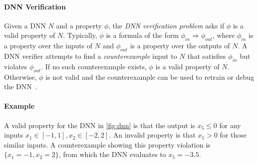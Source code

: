 \documentclass[oneside,11pt,dvipsnames]{book}
\begin{document}
\paragraph{DNN Verification} Given a DNN \(N\) and a property $\phi$, the \emph{DNN verification problem} asks if $\phi$ is a valid property of $N$.
Typically, $\phi$ is a formula of the form $\phi_{in} \Rightarrow \phi_{out}$, where $\phi_{in}$ is a property over the inputs of $N$ and $\phi_{out}$ is a property over the outputs of $N$.
A DNN verifier attempts to find a \emph{counterexample} input to $N$ that satisfies $\phi_{in}$ but violates $\phi_{out}$.  If no such counterexample exists, $\phi$ is a valid property of $N$. Otherwise, $\phi$ is not valid and the counterexample can be used to retrain or debug the DNN~\cite{huang2017safety}.









\paragraph{Example} A valid property for the DNN in \autoref{fig:dnn} is that the output is $x_5 \le 0$ for any inputs $x_1 \in [-1,1], x_2\in[-2,2]$. An invalid property is that $x_5 > 0$ for those similar inputs.
A counterexample showing this property violation is $\{x_1=-1, x_2=2\}$, from which the DNN evaluates to $x_5=-3.5$. 

\end{document}
